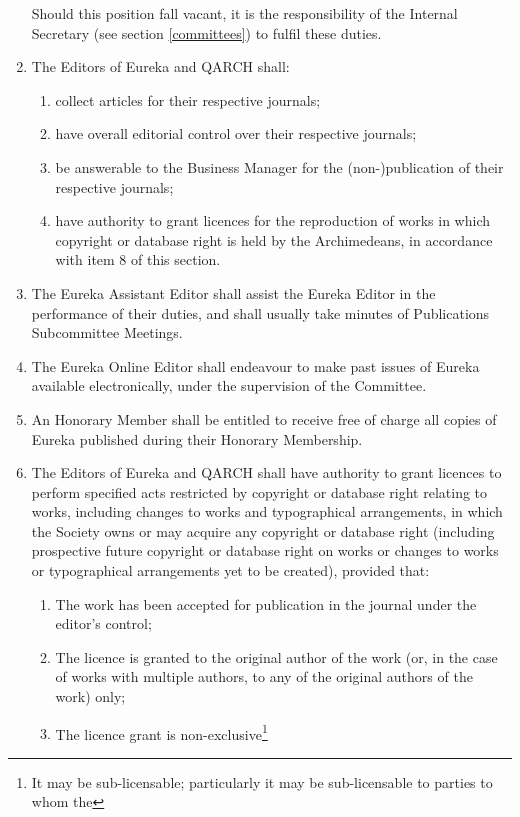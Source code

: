 \documentclass{article}
\begin{document}
\begin{enumerate}
\begin{enumerate}
  \end{enumerate}
	Should this position fall vacant, it is the responsibility of the Internal Secretary (see section \ref{committees}) to fulfil these duties.\\
\item The Editors of Eureka and QARCH shall:
  \begin{enumerate}
  \item collect articles for their respective journals;
  \item have overall editorial control over their respective journals;
  \item be answerable to the Business Manager for the (non-)publication of
  their respective journals;
  \item have authority to grant licences for the reproduction of works in
  which copyright or database right is held by the Archimedeans, in
  accordance with item 8 of this section.
  \end{enumerate}
\item The Eureka Assistant Editor shall assist the Eureka Editor in the performance of their duties, and shall usually take minutes of Publications
Subcommittee Meetings.
\item The Eureka Online Editor shall endeavour to make past issues of Eureka
available electronically, under the supervision of the Committee.
\item An Honorary Member shall be entitled to receive free of charge all copies
of Eureka published during their Honorary Membership.
\item The Editors of Eureka and QARCH shall have authority to grant licences
to perform specified acts restricted by copyright or database right relating
to works, including changes to works and typographical arrangements, in
which the Society owns or may acquire any copyright or database right (including prospective future copyright or database right on works or changes
to works or typographical arrangements yet to be created), provided that:
  \begin{enumerate}
  \item The work has been accepted for publication in the journal under the
  editor's control;
  \item The licence is granted to the original author of the work (or, in the
  case of works with multiple authors, to any of the original authors of
  the work) only;
  \item The licence grant is non-exclusive\footnote{It may be sub-licensable; particularly it may be sub-licensable to parties to whom the
}
\end{enumerate}
\end{enumerate}
\end{document}
